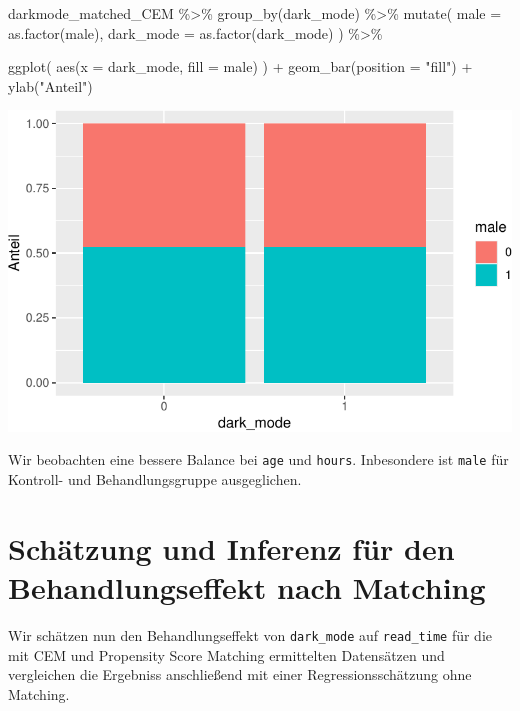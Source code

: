 \documentclass[
  a4paper,
  DIV=11,
  oneside]{scrreprt}
\newenvironment{Shaded}{\begin{snugshade}}{\end{snugshade}}
\newcommand{\AttributeTok}[1]{\textcolor[rgb]{0.40,0.45,0.13}{#1}}
\newcommand{\FunctionTok}[1]{\textcolor[rgb]{0.28,0.35,0.67}{#1}}
\newcommand{\NormalTok}[1]{\textcolor[rgb]{0.00,0.23,0.31}{#1}}
\newcommand{\SpecialCharTok}[1]{\textcolor[rgb]{0.37,0.37,0.37}{#1}}
\newcommand{\StringTok}[1]{\textcolor[rgb]{0.13,0.47,0.30}{#1}}
\begin{document}
\begin{Shaded}
\begin{Highlighting}[]
\NormalTok{darkmode\_matched\_CEM }\SpecialCharTok{\%\textgreater{}\%} 
  \FunctionTok{group\_by}\NormalTok{(dark\_mode) }\SpecialCharTok{\%\textgreater{}\%}
  \FunctionTok{mutate}\NormalTok{(}
    \AttributeTok{male =} \FunctionTok{as.factor}\NormalTok{(male), }
    \AttributeTok{dark\_mode =} \FunctionTok{as.factor}\NormalTok{(dark\_mode)}
\NormalTok{  ) }\SpecialCharTok{\%\textgreater{}\%}
  
  \FunctionTok{ggplot}\NormalTok{(}
    \FunctionTok{aes}\NormalTok{(}\AttributeTok{x =}\NormalTok{ dark\_mode, }\AttributeTok{fill =}\NormalTok{ male)}
\NormalTok{  ) }\SpecialCharTok{+}
  \FunctionTok{geom\_bar}\NormalTok{(}\AttributeTok{position =} \StringTok{"fill"}\NormalTok{) }\SpecialCharTok{+}
  \FunctionTok{ylab}\NormalTok{(}\StringTok{"Anteil"}\NormalTok{)}
\end{Highlighting}
\end{Shaded}

\includegraphics{Matching_files/figure-pdf/unnamed-chunk-39-2.pdf}

Wir beobachten eine bessere Balance bei \texttt{age} und \texttt{hours}.
Inbesondere ist \texttt{male} für Kontroll- und Behandlungsgruppe
ausgeglichen.

\section{Schätzung und Inferenz für den Behandlungseffekt nach
Matching}\label{sec-regadj}

Wir schätzen nun den Behandlungseffekt von \texttt{dark\_mode} auf
\texttt{read\_time} für die mit CEM und Propensity Score Matching
ermittelten Datensätzen und vergleichen die Ergebniss anschließend mit
einer Regressionsschätzung ohne Matching.
\end{document}
